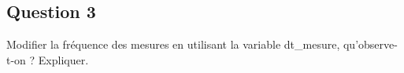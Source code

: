 \documentclass[../CSC_5RO12_TA_TP2.tex]{subfiles}
\begin{document}
\subsection{Question 3}

Modifier la fréquence des mesures en utilisant la variable dt\_mesure, qu'observe-t-on ? Expliquer.
\end{document}
